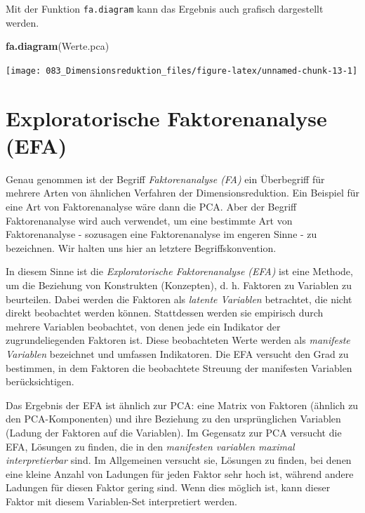 \documentclass[12pt,ngerman,]{book}
\makeatletter
\newenvironment{Shaded}{\begin{snugshade}}{\end{snugshade}}
\newcommand{\KeywordTok}[1]{\textcolor[rgb]{0.13,0.29,0.53}{\textbf{{#1}}}}
\newcommand{\NormalTok}[1]{{#1}}
\newenvironment{kframe}{%
\medskip{}
\setlength{\fboxsep}{.8em}
 \def\at@end@of@kframe{}%
 \ifinner\ifhmode%
  \def\at@end@of@kframe{\end{minipage}}%
  \begin{minipage}{\columnwidth}%
 \fi\fi%
 \def\FrameCommand##1{\hskip\@totalleftmargin \hskip-\fboxsep
 \colorbox{shadecolor}{##1}\hskip-\fboxsep
     \hskip-\linewidth \hskip-\@totalleftmargin \hskip\columnwidth}%
 \MakeFramed {\advance\hsize-\width
   \@totalleftmargin\z@ \linewidth\hsize
   \@setminipage}}%
 {\par\unskip\endMakeFramed%
 \at@end@of@kframe}
\renewenvironment{Shaded}{\begin{kframe}}{\end{kframe}}
\theoremstyle{definition}
\theoremstyle{definition}
\theoremstyle{remark}
\makeatother
\begin{document}
Mit der Funktion \texttt{fa.diagram} kann das Ergebnis auch grafisch
dargestellt werden.

\begin{Shaded}
\begin{Highlighting}[]
\KeywordTok{fa.diagram}\NormalTok{(Werte.pca)}
\end{Highlighting}
\end{Shaded}

\begin{center}\texttt{[image: 083\_Dimensionsreduktion\_files/figure-latex/unnamed-chunk-13-1]} \end{center}

\section{Exploratorische Faktorenanalyse
(EFA)}\label{exploratorische-faktorenanalyse-efa}

Genau genommen ist der Begriff \emph{Faktorenanalyse
(FA)} ein Überbegriff für mehrere Arten von
ähnlichen Verfahren der Dimensionsreduktion. Ein Beispiel für eine Art
von Faktorenanalyse wäre dann die PCA. Aber der Begriff Faktorenanalyse
wird auch verwendet, um eine bestimmte Art von Faktorenanalyse -
sozusagen eine Faktorenanalyse im engeren Sinne - zu bezeichnen. Wir
halten uns hier an letztere Begriffskonvention.

In diesem Sinne ist die \emph{Exploratorische Faktorenanalyse
(EFA)} ist eine Methode, um die
Beziehung von Konstrukten (Konzepten), d. h. Faktoren zu Variablen zu
beurteilen. Dabei werden die Faktoren als \emph{latente Variablen}
betrachtet, die nicht direkt beobachtet werden können. Stattdessen
werden sie empirisch durch mehrere Variablen beobachtet, von denen jede
ein Indikator der zugrundeliegenden Faktoren ist. Diese beobachteten
Werte werden als \emph{manifeste Variablen} bezeichnet und umfassen
Indikatoren. Die EFA versucht den Grad zu bestimmen, in dem Faktoren die
beobachtete Streuung der manifesten Variablen berücksichtigen.

Das Ergebnis der EFA ist ähnlich zur PCA: eine Matrix von Faktoren
(ähnlich zu den PCA-Komponenten) und ihre Beziehung zu den
ursprünglichen Variablen (Ladung der Faktoren auf die Variablen). Im
Gegensatz zur PCA versucht die EFA, Lösungen zu finden, die in den
\emph{manifesten variablen maximal interpretierbar} sind. Im Allgemeinen
versucht sie, Lösungen zu finden, bei denen eine kleine Anzahl von
Ladungen für jeden Faktor sehr hoch ist, während andere Ladungen für
diesen Faktor gering sind. Wenn dies möglich ist, kann dieser Faktor mit
diesem Variablen-Set interpretiert werden.
\end{document}

